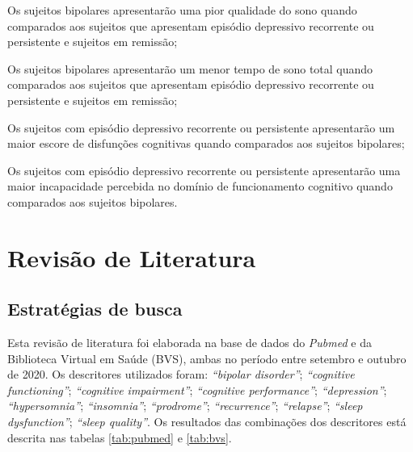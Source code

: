 \documentclass[chapter=TITLE,oneside,12pt,a4paper,english,brazil]{abntex2} %
\begin{document}
    \begin{alineas}
        \item Os sujeitos bipolares apresentarão uma pior qualidade do sono
        quando comparados aos sujeitos que apresentam episódio depressivo
        recorrente ou persistente e sujeitos em remissão;
        \item Os sujeitos bipolares apresentarão um menor tempo de sono total
        quando comparados aos sujeitos que apresentam episódio depressivo
        recorrente ou persistente e sujeitos em remissão;
        \item Os sujeitos com episódio depressivo recorrente ou persistente
        apresentarão um maior escore de disfunções cognitivas quando comparados
        aos sujeitos bipolares;
        \item Os sujeitos com episódio depressivo recorrente ou persistente
        apresentarão uma maior incapacidade percebida no domínio de
        funcionamento cognitivo quando comparados aos sujeitos bipolares.
    \end{alineas}

\vspace{\onelineskip}
\chapter{Revisão de Literatura}\label{sec:revisao}

    \section{Estratégias de busca}\label{sec:estrategias}

    Esta revisão de literatura foi elaborada na base de dados do \textit{Pubmed}
    e da Biblioteca Virtual em Saúde (BVS), ambas no período entre setembro e
    outubro de 2020.
    Os descritores utilizados foram: \textit{``bipolar disorder''};
    \textit{``cognitive functioning''}; \textit{``cognitive impairment''};
    \textit{``cognitive performance''}; \textit{``depression''};
    \textit{``hypersomnia''}; \textit{``insomnia''}; \textit{``prodrome''};
    \textit{``recurrence''}; \textit{``relapse''}; \textit{``sleep dysfunction''};
    \textit{``sleep quality''}.
    Os resultados das combinações dos descritores está descrita nas tabelas
    \ref{tab:pubmed} e \ref{tab:bvs}.
\end{document}

